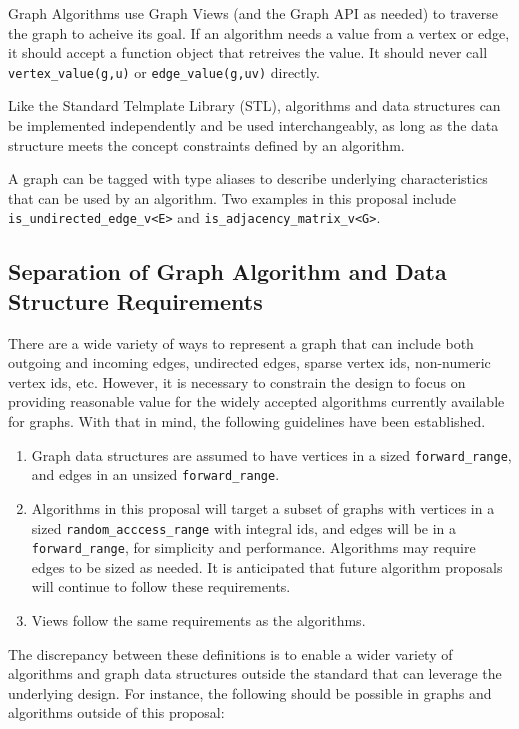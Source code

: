 \documentclass[10pt,onecolumn]{article}
\newcommand{\tcode}[1]{\lstinline[breaklines=true]{#1}}
\begin{document}
Graph Algorithms use Graph Views (and the Graph API as needed) to traverse the graph to acheive its goal. If an algorithm needs a value from 
a vertex or edge, it should accept a function object that retreives the value. It should never call \tcode{vertex_value(g,u)} or \tcode{edge_value(g,uv)}
directly.

Like the Standard Telmplate Library (STL), algorithms and data structures can be implemented independently and be used interchangeably,
as long as the data structure meets the concept constraints defined by an algorithm.

A graph can be tagged with type aliases to describe underlying characteristics that can be used by an algorithm. Two examples
in this proposal include \tcode{is_undirected_edge_v<E>} and \tcode{is_adjacency_matrix_v<G>}.

\subsection{Separation of Graph Algorithm and Data Structure Requirements}

There are a wide variety of ways to represent a graph that can include both outgoing and incoming edges, undirected edges,
sparse vertex ids, non-numeric vertex ids, etc. However, it is necessary to constrain the design to focus on providing reasonable 
value for the widely accepted algorithms currently available for graphs. With that in mind, the following guidelines have been established.
\begin{enumerate}
\item Graph data structures are assumed to have vertices in a sized \tcode{forward_range}, and edges in an unsized \tcode{forward_range}.
\item Algorithms in this proposal will target a subset of graphs with vertices in a sized \tcode{random_acccess_range} with 
integral ids, and edges will be in a \tcode{forward_range}, for simplicity and performance. Algorithms may require edges to be sized as
needed. It is anticipated that future algorithm proposals will continue to follow these requirements.
\item Views follow the same requirements as the algorithms.
\end{enumerate}

The discrepancy between these definitions is to enable a wider variety of algorithms and graph data structures outside the standard that 
can leverage the underlying design. For instance, the following should be possible in graphs and algorithms outside of this proposal:
\end{document}
